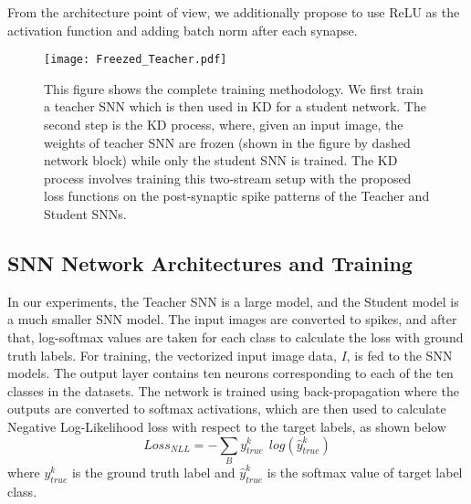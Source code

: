 \documentclass{article}
\begin{document}
From the architecture point of view, we additionally propose to use ReLU as the activation function and adding batch norm after each synapse.


 

\begin{figure*}
\begin{center}
   \texttt{[image: Freezed\_Teacher.pdf]}
\end{center}
   \caption{This figure shows the complete training methodology. We first train a teacher SNN which is then used in KD for a student network. The second step is the KD process, where, given an input image, the weights of teacher SNN are frozen (shown in the figure by dashed network block) while only the student SNN is trained. The KD process involves training this two-stream setup with the proposed loss functions on the post-synaptic spike patterns of the Teacher and Student SNNs.}
\label{fig:distillationProcess}
\end{figure*}

\subsection{SNN Network Architectures and Training}
In our experiments, the Teacher SNN is a large model, and the Student model is a much smaller SNN model. The input images are converted to spikes, and after that, log-softmax values are taken for each class to calculate the loss with ground truth labels. For training, the vectorized input image data, $I$, is fed to the SNN models. The output layer contains ten neurons corresponding to each of the ten classes in the datasets. The network is trained using back-propagation where the outputs are converted to softmax activations, which are then used to calculate Negative Log-Likelihood loss with respect to the target labels, as shown below
\begin{equation}
    Loss_{NLL} = - \sum_{B} y_{true}^{k} \hspace{5pt} log(\hat{y}_{true}^{k})
\end{equation}
where $y_{true}^{k}$ is the ground truth label and $\hat{y}_{true}^{k}$ is the softmax value of target label class.
\end{document}
